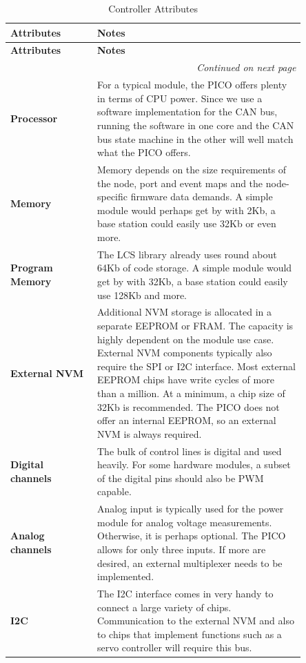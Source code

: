 \begin{longtable}{@{}p{0.25\linewidth}p{0.6\linewidth}@{}}
    \caption{Controller Attributes} \\
    \toprule
    \textbf{Attributes} & \textbf{Notes} \\
    \midrule
    \endfirsthead
    \toprule
    \textbf{Attributes} & \textbf{Notes} \\
    \midrule
    \endhead
    \midrule
    \multicolumn{2}{r}{\textit{Continued on next page}} \\
    \midrule
    \endfoot
    \bottomrule
    \endlastfoot
    \textbf{Processor} & For a typical module, the PICO offers plenty in terms of CPU power. Since we use a software implementation for the CAN bus, running the software in one core and the CAN bus state machine in the other will well match what the PICO offers. \\
    \midrule
    \textbf{Memory} & Memory depends on the size requirements of the node, port and event maps and the node-specific firmware data demands. A simple module would perhaps get by with 2Kb, a base station could easily use 32Kb or even more. \\
    \midrule
    \textbf{Program Memory} & The LCS library already uses round about 64Kb of code storage. A simple module would get by with 32Kb, a base station could easily use 128Kb and more. \\
    \midrule
    \textbf{External NVM} & Additional NVM storage is allocated in a separate EEPROM or FRAM. The capacity is highly dependent on the module use case. External NVM components typically also require the SPI or I2C interface. Most external EEPROM chips have write cycles of more than a million. At a minimum, a chip size of 32Kb is recommended. The PICO does not offer an internal EEPROM, so an external NVM is always required. \\
    \midrule
    \textbf{Digital channels} & The bulk of control lines is digital and used heavily. For some hardware modules, a subset of the digital pins should also be PWM capable. \\
    \midrule
    \textbf{Analog channels} & Analog input is typically used for the power module for analog voltage measurements. Otherwise, it is perhaps optional. The PICO allows for only three inputs. If more are desired, an external multiplexer needs to be implemented. \\
    \midrule
    \textbf{I2C} & The I2C interface comes in very handy to connect a large variety of chips. Communication to the external NVM and also to chips that implement functions such as a servo controller will require this bus. \\

\end{longtable}
